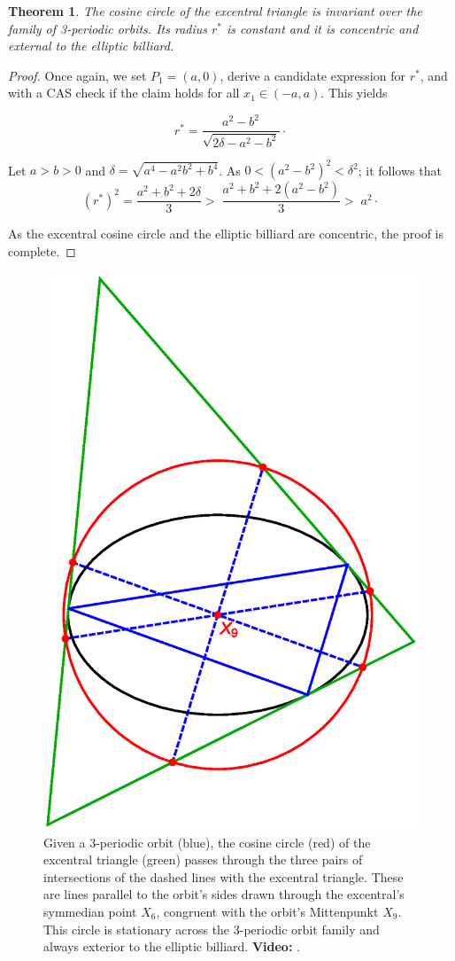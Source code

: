 \documentclass{amsart}
\newtheorem{theorem}{Theorem}
\theoremstyle{definition}
\begin{document}
\begin{theorem}
The cosine circle of the excentral triangle is invariant over the family of 3-periodic orbits. Its radius $r^*$ is constant and it is concentric and external to the elliptic billiard.
\label{thm:cosine-circle}
\end{theorem}

\begin{proof}
Once again, we set $P_1=(a,0)$, derive a candidate expression for $r^*$, and with a CAS check if the claim holds for all $x_1\in(-a,a)$. This yields

\begin{equation}
r^*=\frac{a^2-b^2}{\sqrt{2\delta-a^2-b^2}}\cdot
\end{equation}

Let $a>b>0$ and $\delta=\sqrt{a^4-a^2 b^2+b^4}$. As $0 < {(a^2-b^2)}^{2}<\delta^2$; it follows that
\begin{equation*} (r^{*})^{2}=  \frac{a^2+ b^2+2\delta}{3}
  > \; \frac{a^2+b^2+2(a^2-b^2)}{3} > \; a^2\cdot
\end{equation*}

As the excentral cosine circle and the elliptic billiard are concentric, the proof is complete.
\end{proof}

\begin{figure}[H]
    \centering
    \includegraphics[width=.65\textwidth]{1080_cosine_circle_locus_antiparallels.eps}
    \caption{Given a 3-periodic orbit (blue), the cosine circle (red) of the excentral triangle (green) passes through the three pairs of intersections of the dashed lines with the excentral triangle. These are lines parallel to the orbit's sides drawn through the excentral's symmedian point $X_6$, congruent with the orbit's Mittenpunkt $X_9$. This circle is stationary across the 3-periodic orbit family and always exterior to the elliptic billiard. \textbf{Video:} \cite[PL\#04]{reznik2020-playlist-proofs}.}
    \label{fig:cos-circle}
\end{figure}
\end{document}
